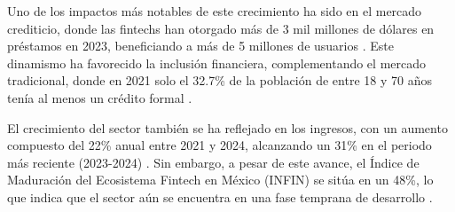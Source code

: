 Uno de los impactos más notables de este crecimiento ha sido en el mercado crediticio, donde las fintechs han otorgado más de 3 mil millones de dólares en préstamos en 2023, beneficiando a más de 5 millones de usuarios \cite{uflow2024}. Este dinamismo ha favorecido la inclusión financiera, complementando el mercado tradicional, donde en 2021 solo el 32.7\% de la población de entre 18 y 70 años tenía al menos un crédito formal \cite{inegi2021}.

\vspace{0.3cm}

El crecimiento del sector también se ha reflejado en los ingresos, con un aumento compuesto del 22\% anual entre 2021 y 2024, alcanzando un 31\% en el periodo más reciente (2023-2024) \cite{reporteindigo2024}. Sin embargo, a pesar de este avance, el Índice de Maduración del Ecosistema Fintech en México (INFIN) se sitúa en un 48\%, lo que indica que el sector aún se encuentra en una fase temprana de desarrollo \cite{santander2024}.

